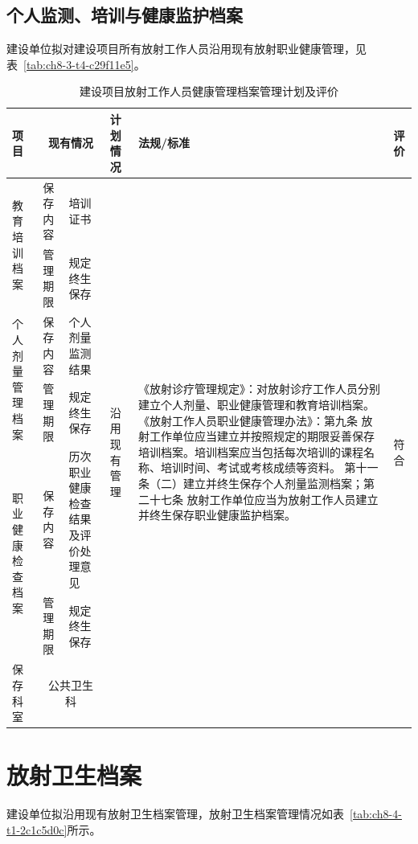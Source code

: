\subsection{个人监测、培训与健康监护档案}

建设单位拟对建设项目所有放射工作人员沿用现有放射职业健康管理，见表~\ref{tab:ch8-3-t4-c29f11e5}。


\begin{table}[H]
\centering
\caption{建设项目放射工作人员健康管理档案管理计划及评价}
\label{tab:ch8-3-t5-9edc314a}
\renewcommand{\arraystretch}{1.5}
\begin{tabular}{|m{1.8cm}|m{1.8cm}|m{2.4cm}|m{1.8cm}|m{5cm}|m{1cm}|}
\hline
项目
& \multicolumn{2}{c|}{现有情况}
& 计划情况
& 法规/标准
& 评价 \\
\hline
\multirow{2}{=}{教育培训档案}
& 保存内容 & 培训证书
& \multirow{7}{=}{沿用现有管理}
& \multirow{7}{=}{《放射诊疗管理规定》：对放射诊疗工作人员分别建立个人剂量、职业健康管理和教育培训档案。
《放射工作人员职业健康管理办法》：第九条 放射工作单位应当建立并按照规定的期限妥善保存培训档案。培训档案应当包括每次培训的课程名称、培训时间、考试或考核成绩等资料。
第十一条（二）建立并终生保存个人剂量监测档案；第二十七条 放射工作单位应当为放射工作人员建立并终生保存职业健康监护档案。}
& \multirow{7}{=}{符合} \\
\cline{2-3}
& 管理期限 & 规定终生保存 & & & \\
\cline{1-3}
\multirow{2}{=}{个人剂量管理档案}
& 保存内容 & 个人剂量监测结果 & & & \\
\cline{2-3}
& 管理期限 & 规定终生保存 & & & \\
\cline{1-3}
\multirow{2}{=}{职业健康检查档案}
& 保存内容 & 历次职业健康检查结果及评价处理意见 & & & \\
\cline{2-3}
& 管理期限 & 规定终生保存 & & & \\
\cline{1-3}
保存科室
& \multicolumn{2}{c|}{公共卫生科}
& & & \\
\hline
\end{tabular}
\end{table}


\section{放射卫生档案}

建设单位拟沿用现有放射卫生档案管理，放射卫生档案管理情况如表~\ref{tab:ch8-4-t1-2c1c5d0c}所示。



